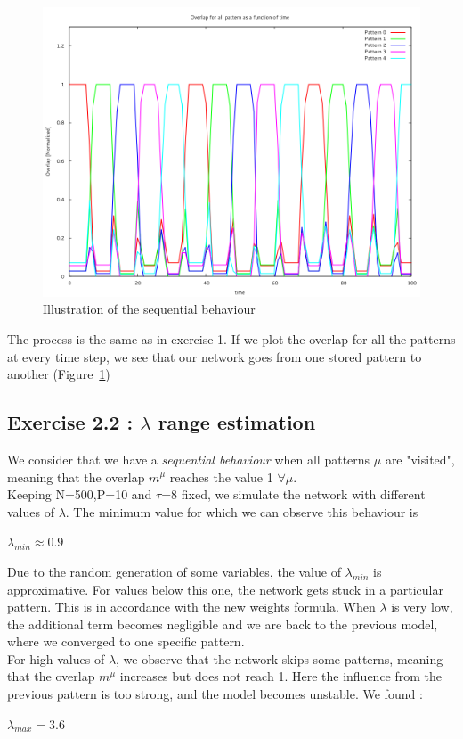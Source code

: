 \begin{figure}\label{seq}
    \begin{center}
    \caption{Illustration of the sequential behaviour}
    \includegraphics[scale=0.3]{img/ex21.png}
    \end{center}
\end{figure}
The process is the same as in exercise 1. If we plot the overlap for all the patterns at every
time step, we see that our network goes from one stored pattern to another (Figure~\ref{seq})


\subsection{Exercise 2.2 : $\lambda$ range estimation}
We consider that we have a {\it sequential behaviour} when all patterns $\mu$ are "visited", meaning that the overlap $m^{\mu}$ reaches the value 1 $\forall \mu$.\\ 
Keeping N=500,P=10 and $\tau$=8 fixed, we simulate the network with different values of $\lambda$. The minimum value for which we can observe this behaviour is 
\begin{center}
$\lambda_{min} \approx 0.9$
\end{center}
Due to the random generation of some variables, the value of $\lambda_{min}$ is approximative.
For values below this one, the network gets stuck in a particular pattern. This is in accordance with the new weights formula. When $\lambda$ is very low, the additional term becomes negligible and we are back to the previous model, where we converged to one specific pattern. \\ 
For high values of $\lambda$, we observe that the network skips some patterns, meaning that the overlap $m^{\mu}$ increases but does not reach 1. Here the influence from the previous pattern is too strong, and the model becomes unstable. We found :
\begin{center}
$\lambda_{max} = 3.6$
\end{center}
